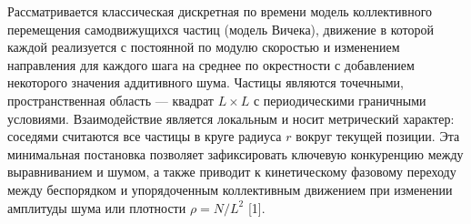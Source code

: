 Рассматривается классическая дискретная по времени модель коллективного перемещения самодвижущихся частиц (модель Вичека), движение в которой каждой реализуется с постоянной по модулю скоростью и изменением направления для каждого шага на среднее по окрестности с добавлением некоторого значения аддитивного шума. Частицы являются точечными, пространственная область — квадрат $L\times L$ с периодическими граничными условиями. Взаимодействие является локальным и носит метрический характер: соседями считаются все частицы в круге радиуса $r$ вокруг текущей позиции. Эта минимальная постановка позволяет зафиксировать ключевую конкуренцию между выравниванием и шумом, а также приводит к кинетическому фазовому переходу между беспорядком и упорядоченным коллективным движением при изменении амплитуды шума или плотности $\rho=N/L^2$ [1].

